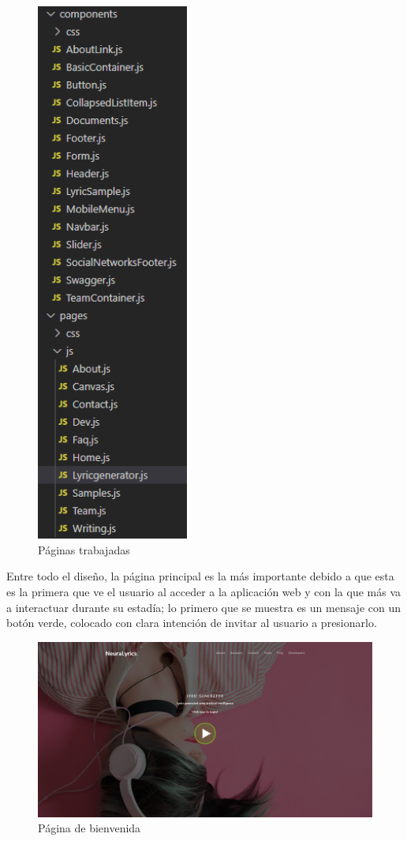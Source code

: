\documentclass[12pt, a4paper, titlepage]{article}
\begin{document}
	\begin{figure}[H]
		\includegraphics[width=5cm]{./Imagenes/AplicacionWeb/Paginas.png}
		\centering 
		\caption{Páginas trabajadas}
	\end{figure}
	Entre todo el diseño, la página principal es la más importante debido a que esta es la primera que ve el usuario al acceder a la aplicación web y con la que más va a interactuar durante su estadía; lo primero que se muestra es un mensaje con un botón verde, colocado con clara intención de invitar al usuario a presionarlo.
	\begin{figure}[H]
		\includegraphics[width=13.5cm]{./Imagenes/AplicacionWeb/Paginaweb.png}
		\centering 
		\caption{Página de bienvenida}
	\end{figure}
\end{document}

